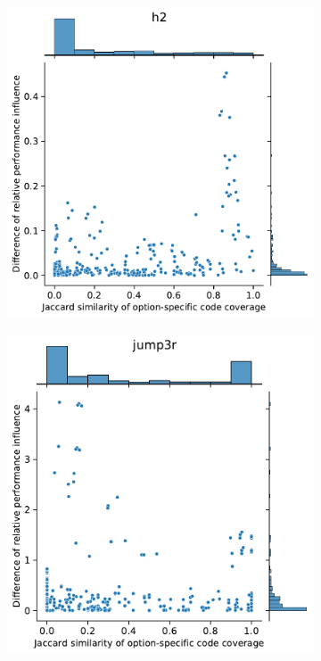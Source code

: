 \begin{figure}
\begin{subfigure}{0.33\textwidth}
	\end{subfigure}
	\begin{subfigure}{0.33\textwidth}
		\centering
		\includegraphics[width=\linewidth]{images/rq3.2/h2_rq3.2.pdf}
	\end{subfigure}
	\begin{subfigure}{0.33\textwidth}
		\centering
		\includegraphics[width=\linewidth]{images/rq3.2/jump3r_rq3.2.pdf}

\end{subfigure}
\end{figure}
